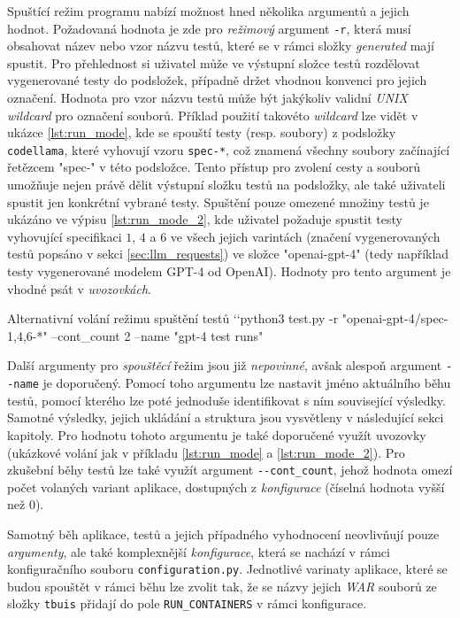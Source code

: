 \documentclass[czech, ma, kiv, he, iso690alph, pdf, viewonly]{fasthesis}
\begin{document}
    Spuštící režim programu nabízí možnost hned několika argumentů a jejich hodnot. Požadovaná hodnota je zde pro \textit{režimový} argument \verb|-r|, která musí obsahovat název nebo vzor názvu testů, které se v rámci složky \textit{generated} mají spustit. Pro přehlednost si uživatel může ve výstupní složce testů rozdělovat vygenerované testy do podsložek, případně držet vhodnou konvenci pro jejich označení. Hodnota pro vzor názvu testů může být jakýkoliv validní \textit{UNIX wildcard} pro označení souborů. Příklad použití takovéto \textit{wildcard} lze vidět v ukázce \ref{lst:run_mode}, kde se spouští testy (resp. soubory) z podsložky \verb|codellama|, které vyhovují vzoru \verb|spec-*|, což znamená všechny soubory začínající řetězcem "spec-"  v této podsložce. Tento přístup pro zvolení cesty a souborů umožňuje nejen právě dělit výstupní složku testů na podsložky, ale také uživateli spustit jen konkrétní vybrané testy. Spuštění pouze omezené množiny testů je ukázáno ve výpisu \ref{lst:run_mode_2}, kde uživatel požaduje spustit testy vyhovující specifikaci \(1\), \(4\) a \(6\) ve všech jejich varintách (značení vygenerovaných testů popsáno v sekci \ref{sec:llm_requests}) ve složce "openai-gpt-4" (tedy například testy vygenerované modelem GPT-4 od OpenAI). Hodnoty pro tento argument je vhodné psát v \emph{uvozovkách}.

    \begin{console}{Alternativní volání režimu spuštění testů \label{lst:run_mode_2}}
`\uxprompt`python3 test.py -r "openai-gpt-4/spec-{1,4,6}-*" --cont_count 2 --name "gpt-4 test runs"
    \end{console}

    Další argumenty pro \textit{spouštěcí} řežim jsou již \emph{nepovinné}, avšak alespoň argument \verb|--name| je doporučený. Pomocí toho argumentu lze nastavit jméno aktuálního běhu testů, pomocí kterého lze poté jednoduše identifikovat s ním související výsledky. Samotné výsledky, jejich ukládání a struktura jsou vysvětleny v následující sekci kapitoly. Pro hodnotu tohoto argumentu je také doporučené využít uvozovky (ukázkové volání jak v příkladu \ref{lst:run_mode} a \ref{lst:run_mode_2}). Pro zkušební běhy testů lze také využít argument \verb|--cont_count|, jehož hodnota omezí počet volaných variant aplikace, dostupných z \textit{konfigurace} (číselná hodnota vyšší než \(0\)).

    Samotný běh aplikace, testů a jejich případného vyhodnocení neovlivňují pouze \emph{argumenty}, ale také komplexnější \emph{konfigurace}, která se nachází v rámci konfiguračního souboru \verb|configuration.py|. Jednotlivé varinaty aplikace, které se budou spouštět v rámci běhu lze zvolit tak, že se názvy jejich \textit{WAR} souborů ze složky \verb|tbuis| přidají do pole \verb|RUN_CONTAINERS| v rámci konfigurace. 
\end{document}
